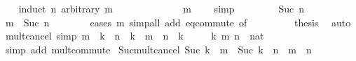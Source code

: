 \begin{isabellebody}
\ \ \isamarkupfalse%
\ {\isacharparenleft}{\kern0pt}induct\ n\ arbitrary{\isacharcolon}{\kern0pt}\ m{\isacharparenright}{\kern0pt}\isanewline
\ \ \ \ \isamarkupfalse%
\ {}\isanewline
\ \ \ \ \isamarkupfalse%
\ \isamarkupfalse%
\ {\isachardoublequoteopen}m\ {\isacharequal}{\kern0pt}\ {}{\isachardoublequoteclose}\ \isamarkupfalse%
\ simp\isanewline
\ \ \isamarkupfalse%
\isanewline
\ \ \ \ \isamarkupfalse%
\ {\isacharparenleft}{\kern0pt}Suc\ n{\isacharparenright}{\kern0pt}\isanewline
\ \ \ \ \isamarkupfalse%
\ \isamarkupfalse%
\ {\isachardoublequoteopen}m\ {\isacharequal}{\kern0pt}\ Suc\ n{\isachardoublequoteclose}\isanewline
\ \ \ \ \ \ \isamarkupfalse%
\ {\isacharparenleft}{\kern0pt}cases\ m{\isacharparenright}{\kern0pt}\ {\isacharparenleft}{\kern0pt}simp{\isacharunderscore}{\kern0pt}all\ add{\isacharcolon}{\kern0pt}\ eq{\isacharunderscore}{\kern0pt}commute\ {\isacharbrackleft}{\kern0pt}of\ {}{\isacharbrackright}{\kern0pt}{\isacharparenright}{\kern0pt}\isanewline
\ \ \isamarkupfalse%
\isanewline
\ \ \isamarkupfalse%
\ \isamarkupfalse%
\ {\isacharquery}{\kern0pt}thesis\ \isamarkupfalse%
\ auto\isanewline
{}\isamarkupfalse%
%
\endisatagproof
{\isafoldproof}%
%
\isadelimproof
\isanewline
%
\endisadelimproof
\isanewline
{}\isamarkupfalse%
\ mult{\isacharunderscore}{\kern0pt}cancel{}\ {\isacharbrackleft}{\kern0pt}simp{\isacharbrackright}{\kern0pt}{\isacharcolon}{\kern0pt}\ {\isachardoublequoteopen}m\ {\isacharasterisk}{\kern0pt}\ k\ {\isacharequal}{\kern0pt}\ n\ {\isacharasterisk}{\kern0pt}\ k\ {\isasymlongleftrightarrow}\ m\ {\isacharequal}{\kern0pt}\ n\ {\isasymor}\ k\ {\isacharequal}{\kern0pt}\ {}{\isachardoublequoteclose}\isanewline
\ \ \ k\ m\ n\ {\isacharcolon}{\kern0pt}{\isacharcolon}{\kern0pt}\ nat\isanewline
%
\isadelimproof
\ \ %
\endisadelimproof
%
\isatagproof
{}\isamarkupfalse%
\ {\isacharparenleft}{\kern0pt}simp\ add{\isacharcolon}{\kern0pt}\ mult{\isachardot}{\kern0pt}commute{\isacharparenright}{\kern0pt}%
\endisatagproof
{\isafoldproof}%
%
\isadelimproof
\isanewline
%
\endisadelimproof
\isanewline
{}\isamarkupfalse%
\ Suc{\isacharunderscore}{\kern0pt}mult{\isacharunderscore}{\kern0pt}cancel{}{\isacharcolon}{\kern0pt}\ {\isachardoublequoteopen}Suc\ k\ {\isacharasterisk}{\kern0pt}\ m\ {\isacharequal}{\kern0pt}\ Suc\ k\ {\isacharasterisk}{\kern0pt}\ n\ {\isasymlongleftrightarrow}\ m\ {\isacharequal}{\kern0pt}\ n{\isachardoublequoteclose}\isanewline

\end{isabellebody}
